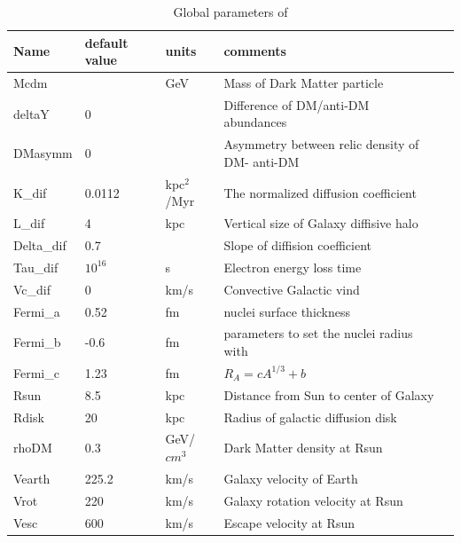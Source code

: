 \documentclass[12pt,a4paper]{article}
\begin{document}
\begin{table}[htbp]
 \caption{Global parameters of \micro}
 \label{paramTab}
\begin{center}
\begin{tabular}{|l|l|l|l|l|}
\hline
  Name      &default value & units &  comments \\  \hline
  Mcdm      &              &  GeV  & Mass of Dark Matter particle           \\ 
  deltaY     &  0          &           & Difference of  DM/anti-DM abundances\\
  DMasymm    &  0          &           & Asymmetry between relic density of  DM- anti-DM\\ 
K\_dif      & 0.0112     & kpc$^2$/Myr & The normalized diffusion coefficient\\
L\_dif      & 4           & kpc       & Vertical size of Galaxy diffisive halo \\
Delta\_dif   & 0.7        &           &Slope of diffision coefficient\\ 
Tau\_dif    & $10^{16}$   &   s       &Electron energy loss time\\
Vc\_dif     & 0           &  km/s     &  Convective Galactic vind \\
Fermi\_a    &  0.52        &  fm   & nuclei  surface thickness \\
Fermi\_b    &  -0.6        &  fm   &  parameters to set the nuclei radius with  \\    
Fermi\_c    &  1.23        &  fm   &  $R_A=c A^{1/3} +b$ \\ 
Rsun        & 8.5          & kpc   & Distance from Sun to center of Galaxy\\
Rdisk       & 20           & kpc   & Radius of galactic diffusion disk \\
rhoDM       &  0.3         & GeV/$cm^3$ & Dark Matter density at Rsun\\
Vearth      &  225.2   & km/s     & Galaxy velocity of Earth     \\
Vrot       &  220   & km/s     & Galaxy rotation velocity at Rsun     \\
Vesc     &  600   & km/s     & Escape velocity at Rsun     \\
\hline
\end{tabular}
\end{center}
\end{table}
\end{document}
